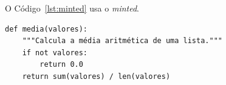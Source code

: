 \documentclass[12pt, a4paper, brazilian]{abntex2}
\begin{document}
O Código~\ref{lst:minted} usa o \emph{minted}.

\begin{listing}[htbp]
  \caption{Função em Python, colorida com o minted}\label{lst:minted}
\begin{verbatim}
def media(valores):
    """Calcula a média aritmética de uma lista."""
    if not valores:
        return 0.0
    return sum(valores) / len(valores)
\end{verbatim}
\end{listing}
\end{document}
